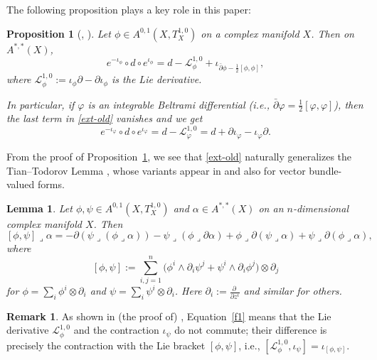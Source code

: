 \documentclass[12pt]{amsart}
\numberwithin{equation}{section}
\newtheorem{proposition}[theorem]{Proposition}
\newtheorem{lemma}  [theorem]     {Lemma}
\theoremstyle{definition}
\theoremstyle{definition}
\theoremstyle{definition}
\newtheorem{remark}  [theorem]     {Remark}
\renewcommand{\1}{\mathsf{1}}
\renewcommand{\>}{\rightarrow}
\newcommand{\p}{\partial}
\def\p{\partial}
\theoremstyle{plain} %
\theoremstyle{plain} %
\theoremstyle{plain} %
\begin{document}
	The following proposition plays a key role in this paper:
	
	\begin{proposition}[{\cite[Theorem 3.4]{LRY15}, \cite[Proposition 2.2]{RZ18}}]\label{main1}
	Let $\phi\in A^{0,1}(X,T^{1,0}_X)$ on a complex manifold $X$. Then on $A^{*,*}(X)$,
	\begin{equation}\label{ext-old}
		e^{-\iota_{\phi}} \circ d \circ e^{\iota_{\phi}}
		= d - \mathcal{L}_\phi^{1,0} + \iota_{\bar{\partial}\phi - \frac{1}{2}[\phi,\phi]},
	\end{equation}
	where $\mathcal{L}_\phi^{1,0} := \iota_\phi \partial - \partial \iota_\phi$ is the Lie derivative.
	
	In particular, if $\varphi$ is an integrable Beltrami differential (i.e., $\bar{\partial}\varphi = \frac{1}{2}[\varphi,\varphi]$), then the last term in \eqref{ext-old} vanishes and we get
	\begin{equation}\label{ssss}
		e^{-\iota_{\varphi}} \circ d \circ e^{\iota_{\varphi}} = d - \mathcal{L}_\varphi^{1,0} = d + \partial \iota_\varphi - \iota_\varphi \partial.
	\end{equation}
	\end{proposition}
	
	From the proof of Proposition~\ref{main1}, we see that \eqref{ext-old} naturally generalizes the Tian--Todorov Lemma \cite{Ti87,To89},
	whose variants appear in \cite{Fr91,BK98,LSY09,Cle05} and also \cite{LR12,LRY15} for vector bundle-valued forms.
\begin{lemma}\label{aaaa}
	Let $\phi, \psi\in A^{0,1}(X,T^{1,0}_X)$ and $\alpha\in A^{*,*}(X)$ on an $n$-dimensional complex
	manifold $X$. Then
	\begin{equation}\label{f1}
		[\phi,\psi]\lrcorner\alpha
		= -\p(\psi\lrcorner(\phi\lrcorner\alpha))
		-\psi\lrcorner(\phi \lrcorner\p\alpha)
		+\phi\lrcorner\p(\psi\lrcorner\alpha)
		+\psi\lrcorner\p(\phi\lrcorner\alpha),
	\end{equation}
	where
	\[
	[\phi,\psi]
	:=\sum_{i,j=1}^n\big(\phi^i\wedge\partial_i\psi^j
	+\psi^i\wedge\partial_i{\phi}^j\big)\otimes\partial_j
	\]
	for $\phi=\sum_{i}\phi^i\otimes\partial_i$
	and $\psi=\sum_{i}\psi^i\otimes\partial_i$. Here $\partial_i:=\frac{\partial\ }{\partial z^i}$ and similar for others. 
\end{lemma}

\begin{remark} As shown in (the proof of) \cite[Lemma 3.2]{LRY15},
Equation~\eqref{f1} means that the Lie derivative $\mathcal{L}^{1,0}_\phi$ and the contraction $\iota_\psi$ do not commute; their difference is precisely the contraction with the Lie bracket $[\phi,\psi]$, i.e., $[\mathcal{L}^{1,0}_\phi,\iota_\psi]=\iota_{[\phi,\psi]}.$
\end{remark}
	
\end{document}
